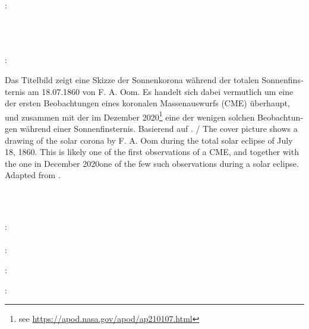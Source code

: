 \thispagestyle{empty}

\hfill

\vfill

\noindent\myName:\\
\textit{\myTitle \\ \mySubtitle} \\%
\textcopyright\ \myTime

\vspace{1cm}

\noindent{}: \\[2mm]
\begin{minipage}{\textwidth}
\renewcommand{\thempfootnote}{\arabic{mpfootnote}}
{\footnotesize \foreignlanguage{ngerman}{Das Titelbild zeigt eine Skizze der Sonnenkorona während der totalen Sonnenfinsternis am 18.07.1860 von F. A. Oom. Es handelt sich dabei vermutlich um eine der ersten Beobachtungen eines koronalen Massenauswurfs (\acs{CME}) überhaupt, und zusammen mit der im Dezember 2020\footnote{see \url{https://apod.nasa.gov/apod/ap210107.html}} eine der wenigen solchen Beobachtungen während einer Sonnenfinsternis. Basierend auf \citet[S. 551]{Ranyard-1879}.}  /
The cover picture shows a drawing of the solar corona by F. A. Oom during the total solar eclipse of July 18, 1860. This is likely one of the first observations of a \ac{CME}, and together with the one in December 2020\footnotemark[1] one of the few such observations during a solar eclipse. Adapted from \citet[page 551]{Ranyard-1879}.}
\end{minipage}\\\

\vspace{1cm}

\noindent{}: \\
\myProf \\

\noindent{}: \\
\myOtherProf


\vspace{1cm}

\noindent{}: \\
\myExamDate

\bigskip

\noindent{}: \\
\myExamDate

\vspace{1cm}

